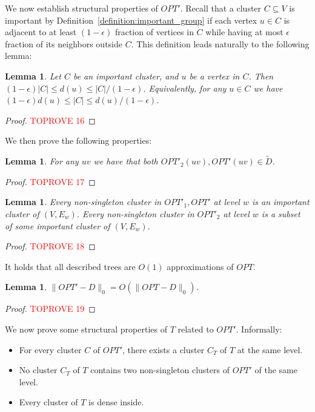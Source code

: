 \documentclass{article}
\newtheorem{lemma}[theorem]{Lemma}
\begin{document}
We now establish structural properties of $OPT'$. Recall that a cluster $C\subseteq V$ is important by Definition~\ref{definition:important_group} if each vertex $u\in C$ is adjacent to at least $(1-\epsilon)$ fraction of vertices in $C$ while having at most $\epsilon$ fraction of its neighbors outside $C$. This definition leads naturally to the following lemma:

\begin{lemma} \label{lem:importantDegrees}
Let $C$ be an important cluster, and $u$ be a vertex in $C$.
Then $(1-\epsilon)|C| \le d(u) \le |C|/(1-\epsilon)$.
Equivalently, for any $u\in C$ we have $(1-\epsilon)d(u) \le |C| \le d(u) / (1-\epsilon)$.
\end{lemma}
\begin{proof}\textcolor{red}{TOPROVE 16}\end{proof}

We then prove the following properties:

\begin{lemma}
For any $uv$ we have that both $OPT'_2(uv), OPT'(uv) \in \widetilde{D}$.
\end{lemma}
\begin{proof}\textcolor{red}{TOPROVE 17}\end{proof}

\begin{lemma} \label{lem:subsetImportant}
Every non-singleton cluster in $OPT'_1, OPT'$ at level $w$ is an important cluster of $(V,E_w)$.
Every non-singleton cluster in $OPT'_2$ at level $w$ is a subset of some important cluster of $(V,E_w)$.
\end{lemma}
\begin{proof}\textcolor{red}{TOPROVE 18}\end{proof}

It holds that all described trees are $O(1)$ approximations of $OPT$.

\begin{lemma} \label{lem:costOPTp}
$\|OPT'-D\|_0 = O(\|OPT-D\|_0)$.
\end{lemma}
\begin{proof}\textcolor{red}{TOPROVE 19}\end{proof}

We now prove some structural properties of $T$ related to $OPT'$.
Informally:
\begin{itemize}
    \item For every cluster $C$ of $OPT'$, there exists a cluster $C_T$ of $T$ at the same level.
    \item No cluster $C_T$ of $T$ contains two non-singleton clusters of $OPT'$ of the same level.
    \item Every cluster of $T$ is dense inside.
\end{itemize}
\end{document}
